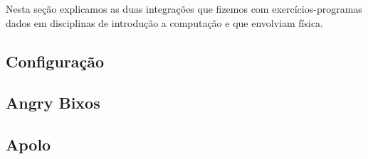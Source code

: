 Nesta seção explicamos as duas integrações que fizemos com exercícios-programas dados em disciplinas de introdução a computação e que envolviam física.

\subsection{Configuração}
\subsection{Angry Bixos}
\subsection{Apolo}

